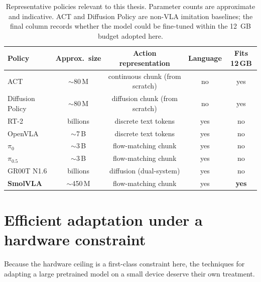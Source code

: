 \begin{table}[ht]
\caption{Representative policies relevant to this thesis. Parameter counts are
approximate and indicative. ACT and Diffusion Policy are non-VLA imitation baselines;
the final column records whether the model could be fine-tuned within the \SI{12}{GB}
budget adopted here.}
\begin{center}
\begin{tabular}{lcccc}
\toprule
Policy & Approx.\ size & Action representation & Language & Fits 12\,GB \\
\midrule
ACT \parencite{zhao2023act}                       & $\sim$80\,M   & continuous chunk (from scratch) & no  & yes \\
Diffusion Policy \parencite{chi2023diffusionpolicy} & $\sim$80\,M & diffusion chunk (from scratch)  & no  & yes \\
RT-2 \parencite{zitkovich2023rt2}                 & billions      & discrete text tokens            & yes & no \\
OpenVLA \parencite{kim2024openvla}                & $\sim$7\,B    & discrete text tokens            & yes & no \\
$\pi_{0}$ \parencite{black2024pi0}                & $\sim$3\,B    & flow-matching chunk             & yes & no \\
$\pi_{0.5}$ \parencite{black2025pi05}             & $\sim$3\,B    & flow-matching chunk             & yes & no \\
GR00T N1.6 \parencite{nvidia2025gr00t}            & billions      & diffusion (dual-system)         & yes & no \\
\textbf{SmolVLA} \parencite{shukor2025smolvla}    & $\sim$450\,M  & flow-matching chunk             & yes & \textbf{yes} \\
\bottomrule
\end{tabular}
\end{center}
\label{tab:vlacompare}
\end{table}

\section{Efficient adaptation under a hardware constraint}
\label{sec:bg-efficient}
Because the hardware ceiling is a first-class constraint here, the techniques for
adapting a large pretrained model on a small device deserve their own treatment.

